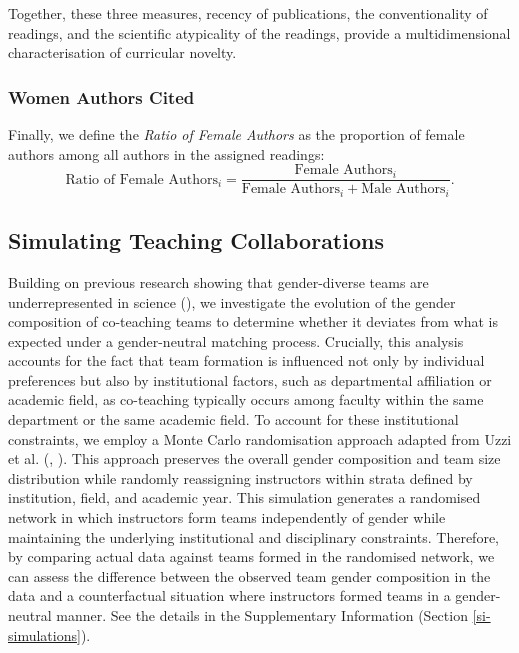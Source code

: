 \documentclass[
  british,
  12pt,
]{article}
\begin{document}
Together, these three measures, recency of publications, the conventionality of readings, and the scientific atypicality of the readings, provide a multidimensional characterisation of curricular novelty.

\subsubsection{Women Authors Cited}\label{women-authors-cited}

Finally, we define the \emph{Ratio of Female Authors} as the proportion of female authors among all authors in the assigned readings:
\[
  \text{Ratio of Female Authors}_i =
  \frac{\text{Female Authors}_i} {\text{Female Authors}_i + \text{Male Authors}_i}.
\]

\subsection{Simulating Teaching Collaborations}\label{simulating-teaching-collaborations}

Building on previous research showing that gender-diverse teams are underrepresented in science (), we investigate the evolution of the gender composition of co-teaching teams to determine whether it deviates from what is expected under a gender-neutral matching process. Crucially, this analysis accounts for the fact that team formation is influenced not only by individual preferences but also by institutional factors, such as departmental affiliation or academic field, as co-teaching typically occurs among faculty within the same department or the same academic field. To account for these institutional constraints, we employ a Monte Carlo randomisation approach adapted from Uzzi et al. (, ). This approach preserves the overall gender composition and team size distribution while randomly reassigning instructors within strata defined by institution, field, and academic year. This simulation generates a randomised network in which instructors form teams independently of gender while maintaining the underlying institutional and disciplinary constraints. Therefore, by comparing actual data against teams formed in the randomised network, we can assess the difference between the observed team gender composition in the data and a counterfactual situation where instructors formed teams in a gender-neutral manner. See the details in the Supplementary Information (Section \ref{si-simulations}).
\end{document}
